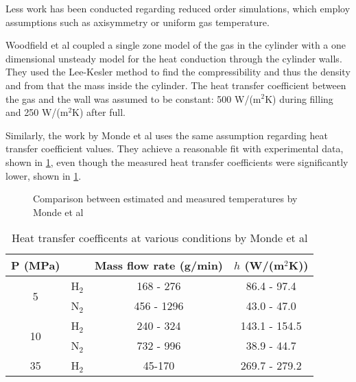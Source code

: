 Less work has been conducted regarding reduced order simulations, which employ assumptions such as axisymmetry or uniform gas temperature. 

Woodfield et al \cite{Woodfield2008} coupled a single zone model of the gas in the cylinder with a one dimensional unsteady model for the heat conduction through the cylinder walls. They used the Lee-Kesler method \cite{Lee1975} to find the compressibility and thus the density and from that the mass inside the cylinder. The heat transfer coefficient between the gas and the wall was assumed to be constant: 500 W/(m$^2$K) during filling and 250 W/(m$^2$K) after full. 



Similarly, the work by Monde et al \cite{Monde2007} uses the same assumption regarding heat transfer coefficient values.  They achieve a reasonable fit with experimental data, shown in \cref{fig:mondeFit}, even though the measured heat transfer coefficients were significantly lower, shown in \cref{tab:mondeHValues}.

\begin{figure}[H]
\begin{center}
\caption{Comparison between estimated and measured temperatures by Monde et al \cite{Monde2007}}
\label{fig:mondeFit}
\end{center}
\end{figure}

\begin{table}[H]
\centering
\begin{small}
  \begin{tabular}{@{} cccc @{}}
    \toprule
    P (MPa) &  & Mass flow rate (g/min) & $h$ (W/(m$^2$K)) \\ 
    \midrule
     \multirow{2}{*}{5} & H$_2$ & 168 - 276 & 86.4 - 97.4 \\ 
     & N$_2$ & 456 - 1296 & 43.0 - 47.0 \\ 
     \multirow{2}{*}{10} & H$_2$& 240 - 324 & 143.1 - 154.5 \\ 
     & N$_2$  & 732 - 996 & 38.9 - 44.7 \\ 
    35 & H$_2$ & 45-170 & 269.7 - 279.2 \\ 
    \bottomrule
  \end{tabular}
\end{small}
\caption{Heat transfer coefficents at various conditions by Monde et al \cite{Monde2007}}
\label{tab:mondeHValues}
\end{table}

